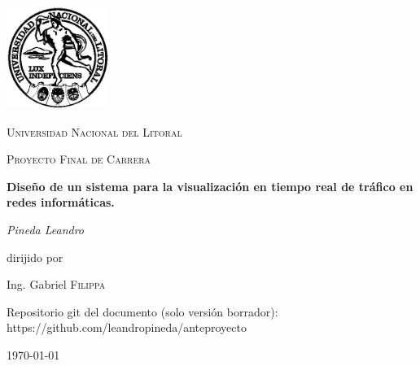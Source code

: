 \documentclass[a4paper,10pt, oneside]{book}
\begin{document}
\begin{titlepage}
	\centering
	\includegraphics[width=0.25\textwidth]{Universidad_del_Litoral}\par\vspace{1cm}
	{\scshape\LARGE Universidad Nacional del Litoral \par}
	\vspace{1cm}
	{\scshape\Large Proyecto Final de Carrera\par}
	\vspace{1.5cm}
	{\huge\bfseries Diseño de un sistema para la visualización en tiempo real de tráfico en redes informáticas.\par}
	\vspace{2cm}
	{\Large\itshape Pineda Leandro\par}
	\vfill
	dirijido por\par
	Ing. Gabriel \textsc{Filippa}

	\vfill
	
	Repositorio git del documento (solo versión borrador): https://github.com/leandropineda/anteproyecto
	
	\vfill
	
	{\large \today\par}
	
\end{titlepage}

\modulolinenumbers[5]
\linenumbers



%
\newpage

\nocite{*}
\printbibliography
\end{document}
